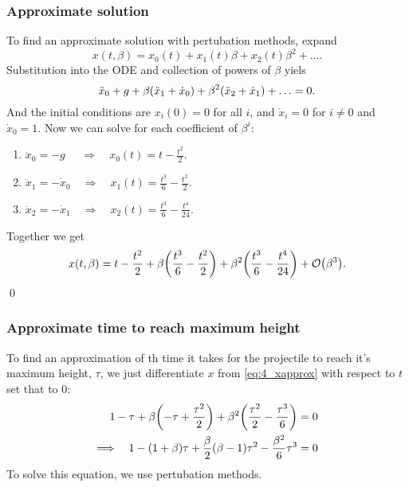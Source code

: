 \documentclass[11pt,letter, swedish, english
]{article}
\begin{document}
\subsubsection{Approximate solution}
To find an approximate solution with pertubation methods, expand
\begin{equation}
x(t, \beta) = x_0(t) + x_1(t)\beta + x_2(t)\beta^2 + \ldots.
\end{equation}
Substitution into the ODE and collection of powers of $\beta$ yiels
\begin{equation}
\ddot{x}_0+g + \beta\qty(\ddot{x}_1+\dot{x}_0) +
\beta^2\qty(\ddot{x}_2 + \dot{x}_1) + \ldots = 0.
\end{equation}
And the initial conditions are $x_i(0)=0$ for all $i$, and
$\dot{x}_i=0$ for $i\neq0$ and $\dot{x}_0=1$. Now we can solve for
each coefficient of $\beta^i$:
\vspace{-1mm}
\begin{enumerate}[label=$\order{\beta^{\arabic*}}$: , start=0, leftmargin=2cm]
\item $\displaystyle \ddot{x}_0=-g_{\phantom{0}} \quad\Longrightarrow\quad
x_0(t) = t - \frac{t^2}{2}$.
\item $\displaystyle \ddot{x}_1=-\dot{x}_0 \quad\Longrightarrow\quad
x_1(t) = \frac{t^3}{6} - \frac{t^2}{2}$.
\item $\displaystyle \ddot{x}_2=-\dot{x}_1 \quad\Longrightarrow\quad
x_2(t) = \frac{t^3}{6} - \frac{t^4}{24}$.
\end{enumerate}
Together we get\footnotemark{}
\begin{equation}\label{eq:4_xapprox}
x(t, \beta) = t - \frac{t^2}{2} + \beta\qty(\frac{t^3}{6}-\frac{t^2}{2})
 + \beta^2\qty(\frac{t^3}{6}-\frac{t^4}{24}) + \order{\beta^3}.
\end{equation}
\qed
{}

\subsubsection{Approximate time to reach maximum height}
To find an approximation of th time it takes for the projectile to
reach it's maximum height, $\tau$, we just differentiate $x$ from
\eqref{eq:4_xapprox} with respect to $t$ set that to $0$:
\begin{equation}
\begin{aligned}
1-\tau + \beta\qty(-\tau+\frac{\tau^2}{2}) 
+ \beta^2\qty(\frac{\tau^2}{2}-\frac{\tau^3}{6}) &= 0\\
\Longrightarrow\quad
1 - (1+\beta)\tau + \frac{\beta}{2}\qty(\beta -1)\tau^2 
- \frac{\beta^2}{6}\tau^3 &= 0
\end{aligned}
\end{equation}
To solve this equation, we use pertubation methods. 
\end{document}
